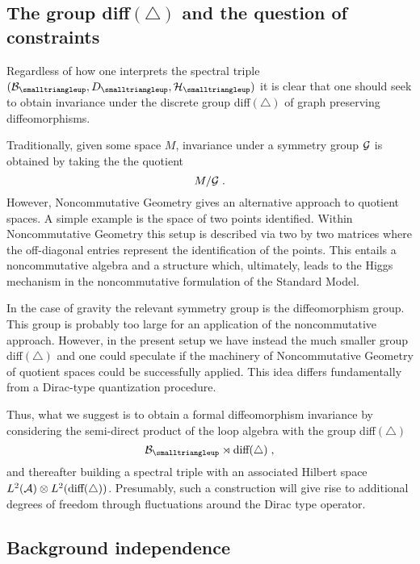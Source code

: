 \documentclass[12pt]{article}
\def\ca{{\cal A}}
\def\cb{{\cal B}}
\def\cg{{\cal G}}
\def\ch{{\cal H}}
\begin{document}
\subsection{The group diff$(\triangle)$ and the question of constraints}

Regardless of how one interprets the spectral triple $(\cb_{\smalltriangleup},D_{\smalltriangleup},\ch_\smalltriangleup)$ it is clear that one should seek to obtain invariance under the discrete group diff$(\triangle)$ of graph preserving diffeomorphisms.

Traditionally, given some space $M$, invariance under a symmetry group $\cg$ is obtained by taking the the quotient 
\[
M/\cg\;.
\]
However, Noncommutative Geometry gives an alternative approach to quotient spaces. A simple example is the space of two points identified. Within Noncommutative Geometry this setup is described via two by two matrices where the off-diagonal entries represent the identification of the points. This entails a noncommutative algebra and a structure which, ultimately, leads to the Higgs mechanism in the noncommutative formulation of the Standard Model.

In the case of gravity the relevant symmetry group is the diffeomorphism group. This group is probably too large for an application of the noncommutative approach. However, in the present setup we have instead the much smaller group diff$(\triangle)$ and one could speculate if the machinery of Noncommutative Geometry of quotient spaces could be successfully applied. 
This idea differs fundamentally from a Dirac-type quantization procedure.

Thus, what we suggest is to obtain a formal diffeomorphism invariance by considering the semi-direct product of the loop algebra with the group diff$(\triangle)$
\[
\cb_{\smalltriangleup} \rtimes \mbox{diff}(\triangle)\;,
\]
and thereafter building a spectral triple with an associated Hilbert space $L^2(\ca)\otimes L^2(\mbox{diff}(\triangle))$. Presumably, such a construction will give rise to additional degrees of freedom through fluctuations around the Dirac type operator.














\subsection{Background independence}
\label{background}
\end{document}
